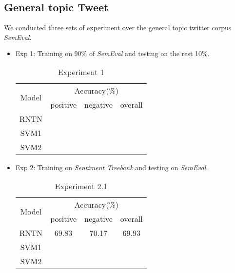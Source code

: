 \subsection{General topic Tweet}
We conducted three sets of experiment over the general topic twitter corpus \textit{SemEval}. 
\begin{itemize}
\item Exp 1: Training on 90\% of \textit{SemEval} and testing on the rest 10\%. 
\begin{table}[H]
  \begin{center}
    \begin{tabular}{cccc}\hline
      \multirow{2}{*}{Model} 
      & \multicolumn{3}{c}{Accuracy(\%)} \\\cline{2-4}
    & positive & negative & overall \\ \hline
    RNTN  &          &    	    &       \\ 
    SVM1  & ~        &          &         \\ 
    SVM2  & ~        &          &         \\ \hline
    \end{tabular}
    \end{center}
    \caption{\label{exp5_1} Experiment 1}
\end{table}

\item Exp 2: Training on \textit{Sentiment Treebank} and testing on \textit{SemEval}.  

\begin{table}[H]
  \begin{center}
    \begin{tabular}{cccc}\hline
      \multirow{2}{*}{Model} 
      & \multicolumn{3}{c}{Accuracy(\%)} \\\cline{2-4}
    & positive & negative & overall \\ \hline
    RNTN  & 69.83     &   70.17	    &   69.93    \\ 
    SVM1  & ~        &          &         \\ 
    SVM2  & ~        &          &         \\ \hline
    \end{tabular}
    \end{center}
    \caption{\label{exp5_2_1} Experiment 2.1}
\end{table}


\end{itemize}
